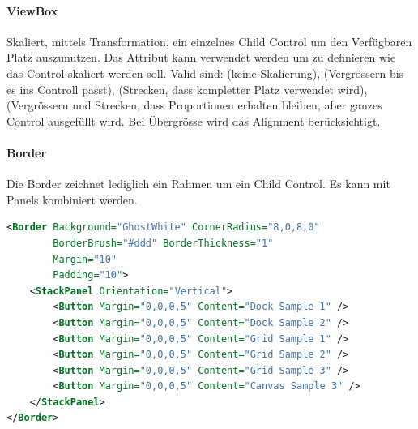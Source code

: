 \paragraph{ViewBox} Skaliert, mittels Transformation, ein einzelnes Child Control um den Verfügbaren Platz auszunutzen. Das Attribut  kann verwendet werden um zu definieren wie das Control skaliert werden soll. Valid sind:  (keine Skalierung),  (Vergrössern bis es ins Controll passt),  (Strecken, dass kompletter Platz verwendet wird),  (Vergrössern und Strecken, dass Proportionen erhalten bleiben, aber ganzes Control ausgefüllt wird. Bei Übergrösse wird das Alignment berücksichtigt.
\paragraph{Border} Die Border zeichnet lediglich ein Rahmen um ein Child Control. Es kann mit Panels kombiniert werden.
\begin{lstlisting}[language=xml]
<Border Background="GhostWhite" CornerRadius="8,0,8,0"
        BorderBrush="#ddd" BorderThickness="1"
        Margin="10"
        Padding="10">
    <StackPanel Orientation="Vertical">
        <Button Margin="0,0,0,5" Content="Dock Sample 1" />
        <Button Margin="0,0,0,5" Content="Dock Sample 2" />
        <Button Margin="0,0,0,5" Content="Grid Sample 1" />
        <Button Margin="0,0,0,5" Content="Grid Sample 2" />
        <Button Margin="0,0,0,5" Content="Grid Sample 3" />
        <Button Margin="0,0,0,5" Content="Canvas Sample 3" />
    </StackPanel>
</Border>
\end{lstlisting}





